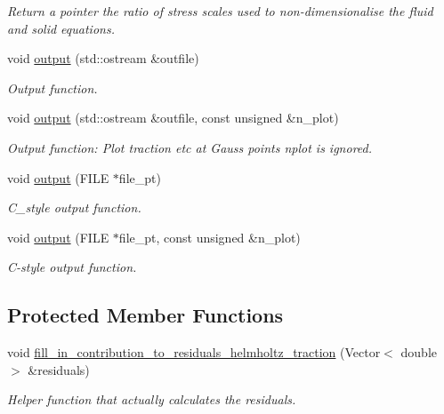 \begin{DoxyCompactItemize}
\begin{DoxyCompactList}\small\item\em Return a pointer the ratio of stress scales used to non-\/dimensionalise the fluid and solid equations. \end{DoxyCompactList}\item 
void \hyperlink{classoomph_1_1TimeHarmonicLinElastLoadedByHelmholtzPressureBCElement_a1ecf56e825d5af950572efe4208ad307}{output} (std\+::ostream \&outfile)
\begin{DoxyCompactList}\small\item\em Output function. \end{DoxyCompactList}\item 
void \hyperlink{classoomph_1_1TimeHarmonicLinElastLoadedByHelmholtzPressureBCElement_a2cfc5c6af366019bc8d8d9bb42ffae03}{output} (std\+::ostream \&outfile, const unsigned \&n\+\_\+plot)
\begin{DoxyCompactList}\small\item\em Output function\+: Plot traction etc at Gauss points nplot is ignored. \end{DoxyCompactList}\item 
void \hyperlink{classoomph_1_1TimeHarmonicLinElastLoadedByHelmholtzPressureBCElement_a6a1d8e8ae161b0ca0aa3de8d2a04a409}{output} (F\+I\+LE $\ast$file\+\_\+pt)
\begin{DoxyCompactList}\small\item\em C\+\_\+style output function. \end{DoxyCompactList}\item 
void \hyperlink{classoomph_1_1TimeHarmonicLinElastLoadedByHelmholtzPressureBCElement_aab8bf1e29247d96cef5a0ab8c593de61}{output} (F\+I\+LE $\ast$file\+\_\+pt, const unsigned \&n\+\_\+plot)
\begin{DoxyCompactList}\small\item\em C-\/style output function. \end{DoxyCompactList}\end{DoxyCompactItemize}
\subsection*{Protected Member Functions}
\begin{DoxyCompactItemize}
\item 
void \hyperlink{classoomph_1_1TimeHarmonicLinElastLoadedByHelmholtzPressureBCElement_a42333cd2a19c901bc01d666d85a4e108}{fill\+\_\+in\+\_\+contribution\+\_\+to\+\_\+residuals\+\_\+helmholtz\+\_\+traction} (Vector$<$ double $>$ \&residuals)
\begin{DoxyCompactList}\small\item\em Helper function that actually calculates the residuals. \end{DoxyCompactList}\end{DoxyCompactItemize}
